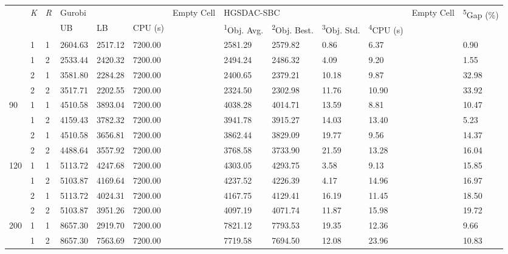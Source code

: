 \documentclass[
  english,
]{article}
\newcounter{none} %
\begin{document}
\begin{otherlanguage}{english}
{\def\LTcaptype{none} %
\begin{longtable}[]{@{}lllllllllllll@{}}
\toprule\noalign{}
\multirow{2}{*}{\textbar{}\emph{S}\textbar{}} & \multirow{2}{*}{\textbar{}\emph{K}\textbar{}} &
\multirow{2}{*}{\textbar{}\emph{R}\textbar{}} & \multicolumn{3}{l}{%
Gurobi} & \multirow{2}{*}{Empty Cell} & \multicolumn{4}{l}{%
HGSDAC-SBC} & \multirow{2}{*}{Empty Cell} & \multirow{2}{*}{\textsuperscript{5}Gap (\%)} \\
& & & UB & LB & CPU (s) & & \textsuperscript{1}Obj. Avg. & \textsuperscript{2}Obj. Best. &
\textsuperscript{3}Obj. Std. & \textsuperscript{4}CPU (s) \\
\midrule\noalign{}
\endhead
\bottomrule\noalign{}
\endlastfoot
\multirow{4}{*}{60} & 1 & 1 & 2604.63 & 2517.12 & 7200.00 & & 2581.29 & 2579.82 & 0.86 & 6.37 & &
0.90 \\
& 1 & 2 & 2533.44 & 2420.32 & 7200.00 & & 2494.24 & 2486.32 & 4.09 & 9.20 & & 1.55 \\
& 2 & 1 & 3581.80 & 2284.28 & 7200.00 & & 2400.65 & 2379.21 & 10.18 & 9.87 & & 32.98 \\
& 2 & 2 & 3517.71 & 2202.55 & 7200.00 & & 2324.50 & 2302.98 & 11.76 & 10.90 & & 33.92 \\
\multirow{4}{*}{90} & 1 & 1 & 4510.58 & 3893.04 & 7200.00 & & 4038.28 & 4014.71 & 13.59 & 8.81 & &
10.47 \\
& 1 & 2 & 4159.43 & 3782.32 & 7200.00 & & 3941.78 & 3915.27 & 14.03 & 13.40 & & 5.23 \\
& 2 & 1 & 4510.58 & 3656.81 & 7200.00 & & 3862.44 & 3829.09 & 19.77 & 9.56 & & 14.37 \\
& 2 & 2 & 4488.64 & 3557.92 & 7200.00 & & 3768.58 & 3733.90 & 21.59 & 13.28 & & 16.04 \\
\multirow{4}{*}{120} & 1 & 1 & 5113.72 & 4247.68 & 7200.00 & & 4303.05 & 4293.75 & 3.58 & 9.13 & &
15.85 \\
& 1 & 2 & 5103.87 & 4169.64 & 7200.00 & & 4237.52 & 4226.39 & 4.17 & 14.96 & & 16.97 \\
& 2 & 1 & 5113.72 & 4024.31 & 7200.00 & & 4167.75 & 4129.41 & 16.19 & 11.45 & & 18.50 \\
& 2 & 2 & 5103.87 & 3951.26 & 7200.00 & & 4097.19 & 4071.74 & 11.87 & 15.98 & & 19.72 \\
\multirow{4}{*}{200} & 1 & 1 & 8657.30 & 2919.70 & 7200.00 & & 7821.12 & 7793.53 & 19.35 & 12.36 & &
9.66 \\
& 1 & 2 & 8657.30 & 7563.69 & 7200.00 & & 7719.58 & 7694.50 & 12.08 & 23.96 & & 10.83 \\

\end{longtable}}
\end{otherlanguage}
\end{document}
